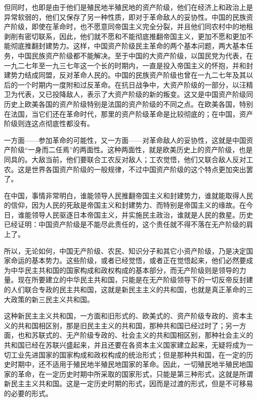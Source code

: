 \documentclass[UTF8, 12pt, a4paper]{ctexrep}
\begin{document}
但同时，也即是由于他们是殖民地半殖民地的资产阶级，他们在经济上和政治上是异常软弱的，他们又保存了另一种性质，即对于革命敌人的妥协性。中国的民族资产阶级，即使在革命时，也不愿意同帝国主义完全分裂，并且他们同农村中的地租剥削有密切联系，因此，他们就不愿和不能彻底推翻帝国主义，更加不愿和更加不能彻底推翻封建势力。这样，中国资产阶级民主革命的两个基本问题，两大基本任务，中国民族资产阶级都不能解决。至于中国的大资产阶级，以国民党为代表，在一九二七年至一九三七年这一个长的时期内，一直是投入帝国主义的怀抱，并和封建势力结成同盟，反对革命人民的。中国的民族资产阶级也曾在一九二七年及其以后的一个时期内一度附和过反革命。在抗日战争中，大资产阶级的一部分，以汪精卫为代表，又已投降敌人，表示了大资产阶级的新的叛变。这又是中国资产阶级同历史上欧美各国的资产阶级特别是法国的资产阶级的不同之点。在欧美各国，特别在法国，当它们还在革命时代，那里的资产阶级革命是比较彻底的；在中国，资产阶级则连这点彻底性都没有。

一方面——参加革命的可能性，又一方面——对革命敌人的妥协性，这就是中国资产阶级“一身而二任焉”的两面性。这种两面性，就是欧美历史上的资产阶级，也是同具的。大敌当前，他们要联合工农反对敌人；工农觉悟，他们又联合敌人反对工农。这是世界各国资产阶级的一般规律，不过中国资产阶级的这个特点更加突出罢了。

在中国，事情非常明白，谁能领导人民推翻帝国主义和封建势力，谁就能取得人民的信仰，因为人民的死敌是帝国主义和封建势力、而特别是帝国主义的缘故。在今日，谁能领导人民驱逐日本帝国主义，并实施民主政治，谁就是人民的救星。历史已经证明：中国资产阶级是不能尽此责任的，这个责任就不得不落在无产阶级的肩上了。

所以，无论如何，中国无产阶级、农民、知识分子和其它小资产阶级，乃是决定国家命运的基本势力。这些阶级，或者已经觉悟，或者正在觉悟起来，他们必然要成为中华民主共和国的国家构成和政权构成的基本部分，而无产阶级则是领导的力量。现在所要建立的中华民主共和国，只能是在无产阶级领导下的一切反帝反封建的人们联合专政的民主共和国，这就是新民主主义的共和国，也就是真正革命的三大政策的新三民主义共和国。

这种新民主主义共和国，一方面和旧形式的、欧美式的、资产阶级专政的、资本主义的共和国相区别，那是旧民主主义的共和国，那种共和国已经过时了；另一方面，也和苏联式的、无产阶级专政的、社会主义的共和国相区别，那种社会主义的共和国已经在苏联兴盛起来，并且还要在各资本主义国家建立起来，无疑将成为一切工业先进国家的国家构成和政权构成的统治形式；但是那种共和国，在一定的历史时期中，还不适用于殖民地半殖民地国家的革命。因此，一切殖民地半殖民地国家的革命，在一定历史时期中所采取的国家形式，只能是第三种形式，这就是所谓新民主主义共和国。这是一定历史时期的形式，因而是过渡的形式，但是不可移易的必要的形式。
\end{document}
